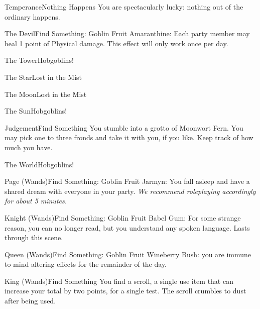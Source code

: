 \documentclass[green]{gl2018}
\begin{document}
\begin{location}{Temperance}{Nothing Happens}
You are spectacularly lucky: nothing out of the ordinary happens.
\end{location}
\begin{location}{The Devil}{Find Something: Goblin Fruit}
Amaranthine: Each party member may heal 1 point of Physical damage.  This effect will only work once per day.
\end{location}
\begin{location}{The Tower}{Hobgoblins!}
\end{location}
\begin{location}{The Star}{Lost in the Mist}
\end{location}
\begin{location}{The Moon}{Lost in the Mist}
\end{location}
\begin{location}{The Sun}{Hobgoblins!}
\end{location}
\begin{location}{Judgement}{Find Something}
You stumble into a grotto of Moonwort Fern.  You may pick one to three fronds and take it with you, if you like.  Keep track of how much you have.
\end{location}
\begin{location}{The World}{Hobgoblins!}
\end{location}
\begin{location}{Page (Wands)}{Find Something: Goblin Fruit}
Jarmyn: You fall asleep and have a shared dream with everyone in your party. \emph{We recommend roleplaying accordingly for about 5 minutes.}
\end{location}
\begin{location}{Knight (Wands)}{Find Something: Goblin Fruit}
Babel Gum:  For some strange reason, you can no longer read, but you understand any spoken language.  Lasts through this scene.
\end{location}
\begin{location}{Queen (Wands)}{Find Something: Goblin Fruit}
Wineberry Bush: you are immune to mind altering effects for the remainder of the day.
\end{location}
\begin{location}{King (Wands)}{Find Something}
You find a scroll, a single use item that can increase your total by two points, for a single test.  The scroll crumbles to dust after being used.
\end{location}
\end{document}
